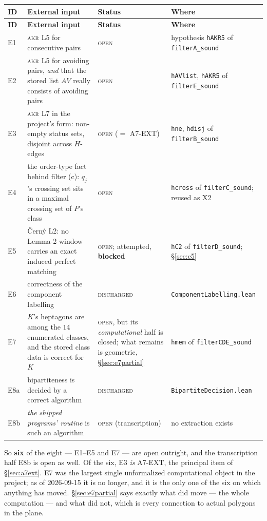 \documentclass[11pt,a4paper]{article}
\theoremstyle{plain}
\theoremstyle{definition}
\theoremstyle{remark}
\newcommand{\stat}[1]{\footnotesize\textsc{#1}}
\begin{document}
{\footnotesize\setlength{\tabcolsep}{4pt}
\begin{longtable}{@{}>{\raggedright\arraybackslash}p{1.1cm}>{\raggedright\arraybackslash}p{6.3cm}>{\raggedright\arraybackslash}p{2.2cm}>{\raggedright\arraybackslash}p{4.4cm}@{}}
\toprule
\textbf{ID} & \textbf{External input} & \textbf{Status} & \textbf{Where} \\
\midrule
\endfirsthead
\toprule
\textbf{ID} & \textbf{External input} & \textbf{Status} & \textbf{Where} \\
\midrule
\endhead
\bottomrule
\endfoot
\textsf{E1} & \textsc{akr} L5 for consecutive pairs & \stat{open} & hypothesis \texttt{hAKR5} of \texttt{filterA\_sound} \\
\textsf{E2} & \textsc{akr} L5 for avoiding pairs, \emph{and} that the stored list $AV$ really consists of avoiding pairs & \stat{open} & \texttt{hAVlist}, \texttt{hAKR5} of \texttt{filterE\_sound} \\
\textsf{E3} & \textsc{akr} L7 in the project's form: non-empty status sets, disjoint across $H$-edges & \stat{open} ($=$ \textsf{A7-EXT}) & \texttt{hne}, \texttt{hdisj} of \texttt{filterB\_sound} \\
\textsf{E4} & the order-type fact behind filter (c): $q_j$'s crossing set sits in a maximal crossing set of $P$'s class & \stat{open} & \texttt{hcross} of \texttt{filterC\_sound}; reused as \textsf{X2} \\
\textsf{E5} & {\v C}ern{\'y} L2: no Lemma-2 window carries an exact induced perfect matching & \stat{open}; attempted, \textbf{blocked} & \texttt{hC2} of \texttt{filterD\_sound}; \S\ref{sec:e5} \\
\textsf{E6} & correctness of the component labelling & \stat{discharged} & \texttt{ComponentLabelling.lean} \\
\textsf{E7} & $K$'s heptagons are among the $14$ enumerated classes, and the stored class data is correct for $K$ & \stat{open}, but its \emph{computational} half is closed; what remains is geometric, \S\ref{sec:e7partial} & \texttt{hmem} of \texttt{filterCDE\_sound} \\
\textsf{E8a} & bipartiteness is decided by a correct algorithm & \stat{discharged} & \texttt{BipartiteDecision.lean} \\
\textsf{E8b} & \emph{the shipped programs' routine} is such an algorithm & \stat{open} (transcription) & no extraction exists \\
\end{longtable}
}

\noindent
So \textbf{six} of the eight --- \textsf{E1}--\textsf{E5} and \textsf{E7} --- are
open outright, and the transcription half \textsf{E8b} is open as well. Of the
six, \textsf{E3} \emph{is} \textsf{A7-EXT}, the principal item of
\S\ref{sec:a7ext}. \textsf{E7} was the largest single unformalized
computational object in the project; as of 2026-09-15 it is no longer, and it is
the only one of the six on which anything has moved. \S\ref{sec:e7partial} says
exactly what did move --- the whole computation --- and what did not, which is
every connection to actual polygons in the plane.
\end{document}
